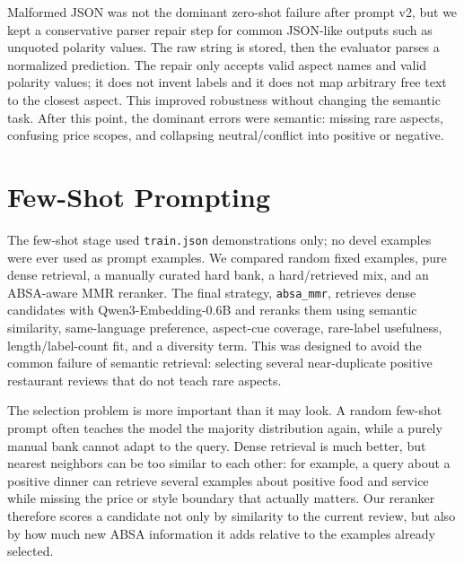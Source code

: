 \documentclass[11pt,a4paper]{article}
\newcommand{\code}[1]{\texttt{#1}}
\begin{document}
Malformed JSON was not the dominant zero-shot failure after prompt v2, but we kept a conservative parser repair step for common JSON-like outputs such as unquoted polarity values. The raw string is stored, then the evaluator parses a normalized prediction. The repair only accepts valid aspect names and valid polarity values; it does not invent labels and it does not map arbitrary free text to the closest aspect. This improved robustness without changing the semantic task. After this point, the dominant errors were semantic: missing rare aspects, confusing price scopes, and collapsing neutral/conflict into positive or negative.

\section{Few-Shot Prompting}

The few-shot stage used \code{train.json} demonstrations only; no devel examples were ever used as prompt examples. We compared random fixed examples, pure dense retrieval, a manually curated hard bank, a hard/retrieved mix, and an ABSA-aware MMR reranker. The final strategy, \code{absa\_mmr}, retrieves dense candidates with Qwen3-Embedding-0.6B and reranks them using semantic similarity, same-language preference, aspect-cue coverage, rare-label usefulness, length/label-count fit, and a diversity term. This was designed to avoid the common failure of semantic retrieval: selecting several near-duplicate positive restaurant reviews that do not teach rare aspects.

The selection problem is more important than it may look. A random few-shot prompt often teaches the model the majority distribution again, while a purely manual bank cannot adapt to the query. Dense retrieval is much better, but nearest neighbors can be too similar to each other: for example, a query about a positive dinner can retrieve several examples about positive food and service while missing the price or style boundary that actually matters. Our reranker therefore scores a candidate not only by similarity to the current review, but also by how much new ABSA information it adds relative to the examples already selected.
\end{document}
